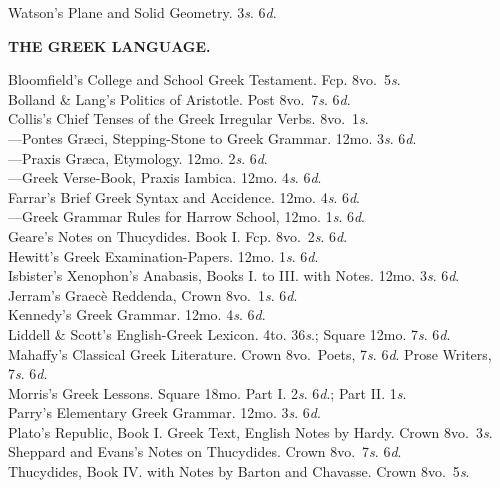 \documentclass[letterpaper,12pt,oneside,openany]{memoir}
\newcommand{\E}{\hspace*{2mm}---\hspace*{2mm}}
\begin{document}
\begin{footnotesize}
Watson's Plane and Solid Geometry. 3\textit{s}. 6\textit{d}.
\begin{center}
\textbf{THE GREEK LANGUAGE.}
\end{center}
Bloomfield's College and School Greek Testament. Fcp. 8vo.\ 5\textit{s}.\\
Bolland \& Lang's Politics of Aristotle. Post 8vo.\ 7\textit{s}. 6\textit{d}.\\
Collis's Chief Tenses of the Greek Irregular Verbs. 8vo.\ 1\textit{s}.\\
\E Pontes Gr{\ae}ci, Stepping-Stone to Greek Grammar. 12mo. 3\textit{s}. 6\textit{d}.\\
\E Praxis Gr{\ae}ca, Etymology. 12mo. 2\textit{s}. 6\textit{d}.\\
\E Greek Verse-Book, Praxis Iambica. 12mo. 4\textit{s}. 6\textit{d}.\\
Farrar's Brief Greek Syntax and Accidence. 12mo. 4\textit{s}. 6\textit{d}.\\
\E Greek Grammar Rules for Harrow School, 12mo. 1\textit{s}. 6\textit{d}.\\
Geare's Notes on Thucydides. Book I. Fcp. 8vo.\ 2\textit{s}. 6\textit{d}.\\
Hewitt's Greek Examination-Papers. 12mo. 1\textit{s}. 6\textit{d}.\\
Isbister's Xenophon's Anabasis, Books I. to III. with Notes. 12mo. 3\textit{s}. 6\textit{d}.\\
Jerram's Graec{\`e} Reddenda, Crown 8vo.\ 1\textit{s}. 6\textit{d}.\\
Kennedy's Greek Grammar. 12mo. 4\textit{s}. 6\textit{d}.\\
Liddell \& Scott's English-Greek Lexicon. 4to. 36\textit{s}.; Square 12mo. 7\textit{s}. 6\textit{d}.\\
Mahaffy's Classical Greek Literature. Crown 8vo.\ Poets, 7\textit{s}. 6\textit{d}. Prose Writers, 7\textit{s}. 6\textit{d}.\\
Morris's Greek Lessons. Square 18mo. Part I. 2\textit{s}. 6\textit{d}.; Part II. 1\textit{s}.\\
Parry's Elementary Greek Grammar. 12mo. 3\textit{s}. 6\textit{d}.\\
Plato's Republic, Book I. Greek Text, English Notes by Hardy. Crown 8vo.\ 3\textit{s}.\\
Sheppard and Evans's Notes on Thucydides. Crown 8vo.\ 7\textit{s}. 6\textit{d}.\\
Thucydides, Book IV. with Notes by Barton and Chavasse. Crown 8vo.\ 5\textit{s}.\\

\end{footnotesize}
\end{document}
